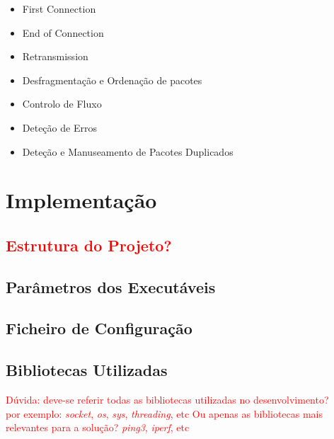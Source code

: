 \documentclass[a4paper,12pt]{scrreprt}
\begin{document}
\begin{itemize}
    \item First Connection
    \item End of Connection
    \item Retransmission
    \item Desfragmentação e Ordenação de pacotes
    \item Controlo de Fluxo
    \item Deteção de Erros
    \item Deteção e Manuseamento de Pacotes Duplicados
\end{itemize}



\chapter{Implementação}

\section{\textcolor{red}{Estrutura do Projeto?}}

\section{Parâmetros dos Executáveis}

\section{Ficheiro de Configuração}

\section{Bibliotecas Utilizadas}

\textcolor{red}{
    Dúvida: deve-se referir todas as bibliotecas utilizadas no desenvolvimento? \\
    por exemplo: \textit{socket}, \textit{os}, \textit{sys}, \textit{threading}, etc
    Ou apenas as bibliotecas mais relevantes para a solução? \textit{ping3}, \textit{iperf}, etc
}
\end{document}
